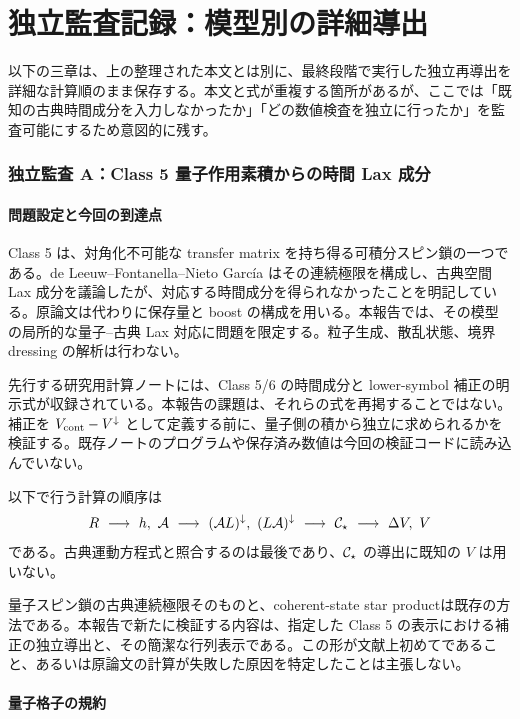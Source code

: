 \part{独立監査記録：模型別の詳細導出}
\label{part:audits}
以下の三章は、上の整理された本文とは別に、最終段階で実行した独立再導出を詳細な計算順のまま保存する。本文と式が重複する箇所があるが、ここでは「既知の古典時間成分を入力しなかったか」「どの数値検査を独立に行ったか」を監査可能にするため意図的に残す。

\section{独立監査 A：Class 5 量子作用素積からの時間 Lax 成分}
\subsection{問題設定と今回の到達点}

Class 5 は、対角化不可能な transfer matrix を持ち得る可積分スピン鎖の一つである。de Leeuw--Fontanella--Nieto Garc\'ia はその連続極限を構成し、古典空間 Lax 成分を議論したが、対応する時間成分を得られなかったことを明記している。原論文は代わりに保存量と boost の構成を用いる\cite{DFN}。本報告では、その模型の局所的な量子--古典 Lax 対応に問題を限定する。粒子生成、散乱状態、境界 dressing の解析は行わない。

先行する研究用計算ノートには、Class 5/6 の時間成分と lower-symbol 補正の明示式が収録されている。本報告の課題は、それらの式を再掲することではない。補正を $V_{\rm cont}-V^{\downarrow}$ として定義する前に、量子側の積から独立に求められるかを検証する。既存ノートのプログラムや保存済み数値は今回の検証コードに読み込んでいない。

以下で行う計算の順序は
\begin{equation}
R\ \longrightarrow\ h,\ \mathcal A
\ \longrightarrow\ (\mathcal A L)^{\downarrow},\ (L\mathcal A)^{\downarrow}
\ \longrightarrow\ \Cstar
\ \longrightarrow\ \Delta V,\ V
\label{audit5q:eq:order}
\end{equation}
である。古典運動方程式と照合するのは最後であり、$\mathcal C_{\star}$ の導出に既知の $V$ は用いない。

量子スピン鎖の古典連続極限そのもの\cite{ADS}と、coherent-state star product\cite{KS}は既存の方法である。本報告で新たに検証する内容は、指定した Class 5 の表示における補正の独立導出と、その簡潔な行列表示である。この形が文献上初めてであること、あるいは原論文の計算が失敗した原因を特定したことは主張しない。

\subsection{量子格子の規約}
